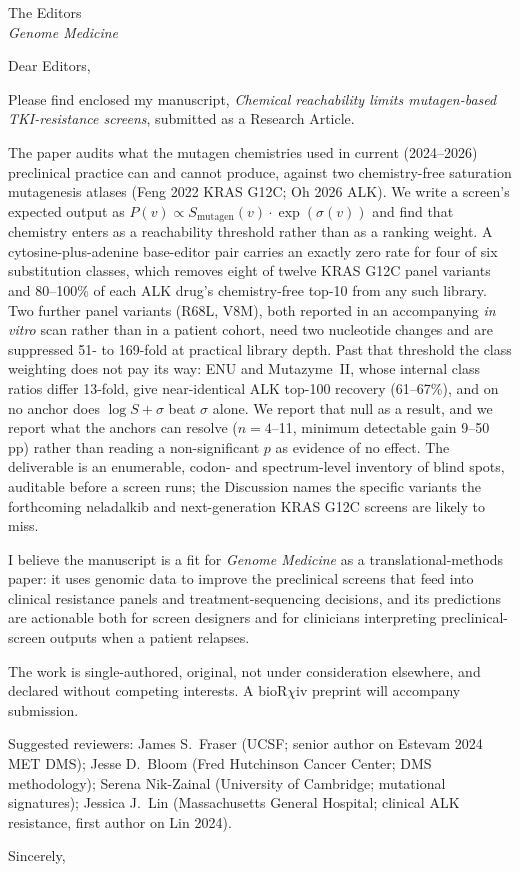 \documentclass[11pt,a4paper]{letter}
\date{15 October 2026}
\begin{document}
\begin{letter}{The Editors \\ \emph{Genome Medicine}}

\opening{Dear Editors,}

Please find enclosed my manuscript, \emph{Chemical reachability limits mutagen-based TKI-resistance screens}, submitted as a Research Article.

The paper audits what the mutagen chemistries used in current (2024--2026) preclinical practice can and cannot produce, against two chemistry-free saturation mutagenesis atlases (Feng 2022 KRAS G12C; Oh 2026 ALK). We write a screen's expected output as $P(v) \propto S_{\mathrm{mutagen}}(v)\cdot \exp(\sigma(v))$ and find that chemistry enters as a reachability threshold rather than as a ranking weight. A cytosine-plus-adenine base-editor pair carries an exactly zero rate for four of six substitution classes, which removes eight of twelve KRAS G12C panel variants and 80--100\% of each ALK drug's chemistry-free top-10 from any such library. Two further panel variants (R68L, V8M), both reported in an accompanying \emph{in vitro} scan rather than in a patient cohort, need two nucleotide changes and are suppressed 51- to 169-fold at practical library depth. Past that threshold the class weighting does not pay its way: ENU and Mutazyme~II, whose internal class ratios differ 13-fold, give near-identical ALK top-100 recovery (61--67\%), and on no anchor does $\log S + \sigma$ beat $\sigma$ alone. We report that null as a result, and we report what the anchors can resolve ($n = 4$--11, minimum detectable gain 9--50 pp) rather than reading a non-significant $p$ as evidence of no effect. The deliverable is an enumerable, codon- and spectrum-level inventory of blind spots, auditable before a screen runs; the Discussion names the specific variants the forthcoming neladalkib and next-generation KRAS G12C screens are likely to miss.

I believe the manuscript is a fit for \emph{Genome Medicine} as a translational-methods paper: it uses genomic data to improve the preclinical screens that feed into clinical resistance panels and treatment-sequencing decisions, and its predictions are actionable both for screen designers and for clinicians interpreting preclinical-screen outputs when a patient relapses.

The work is single-authored, original, not under consideration elsewhere, and declared without competing interests. A bioR$\chi$iv preprint will accompany submission.

Suggested reviewers: James S.\ Fraser (UCSF; senior author on Estevam 2024 MET DMS); Jesse D.\ Bloom (Fred Hutchinson Cancer Center; DMS methodology); Serena Nik-Zainal (University of Cambridge; mutational signatures); Jessica J.\ Lin (Massachusetts General Hospital; clinical ALK resistance, first author on Lin 2024).

\closing{Sincerely,}

\end{letter}
\end{document}

